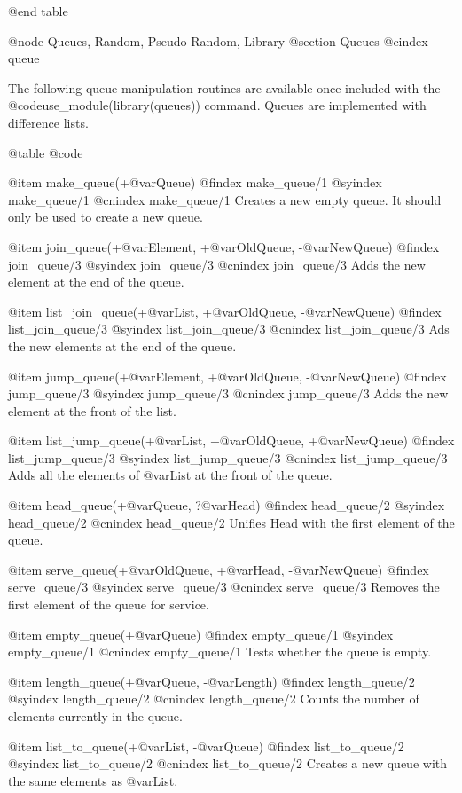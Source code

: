 {{{{{{{{@end table

@node Queues, Random, Pseudo Random, Library
@section Queues
@cindex queue

The following queue manipulation routines are available once
included with the @code{use_module(library(queues))} command. Queues are
implemented with difference lists.

@table @code

@item make_queue(+@var{Queue})
@findex make_queue/1
@syindex make_queue/1
@cnindex make_queue/1
Creates a new empty queue. It should only be used to create a new queue.

@item join_queue(+@var{Element}, +@var{OldQueue}, -@var{NewQueue})
@findex join_queue/3
@syindex join_queue/3
@cnindex join_queue/3
Adds the new element at the end of the queue.

@item list_join_queue(+@var{List}, +@var{OldQueue}, -@var{NewQueue})
@findex list_join_queue/3
@syindex list_join_queue/3
@cnindex list_join_queue/3
Ads the new elements at the end of the queue.

@item jump_queue(+@var{Element}, +@var{OldQueue}, -@var{NewQueue})
@findex jump_queue/3
@syindex jump_queue/3
@cnindex jump_queue/3
Adds the new element at the front of the list.

@item list_jump_queue(+@var{List}, +@var{OldQueue}, +@var{NewQueue})
@findex list_jump_queue/3
@syindex list_jump_queue/3
@cnindex list_jump_queue/3
Adds all the elements of @var{List} at the front of the queue.

@item head_queue(+@var{Queue}, ?@var{Head})
@findex head_queue/2
@syindex head_queue/2
@cnindex head_queue/2
Unifies Head with the first element of the queue.

@item serve_queue(+@var{OldQueue}, +@var{Head}, -@var{NewQueue})
@findex serve_queue/3
@syindex serve_queue/3
@cnindex serve_queue/3
Removes the first element of the queue for service.

@item empty_queue(+@var{Queue})
@findex empty_queue/1
@syindex empty_queue/1
@cnindex empty_queue/1
Tests whether the queue is empty.

@item length_queue(+@var{Queue}, -@var{Length})
@findex length_queue/2
@syindex length_queue/2
@cnindex length_queue/2
Counts the number of elements currently in the queue.

@item list_to_queue(+@var{List}, -@var{Queue})
@findex list_to_queue/2
@syindex list_to_queue/2
@cnindex list_to_queue/2
Creates a new queue with the same elements as @var{List.}

}}}}}}}}
